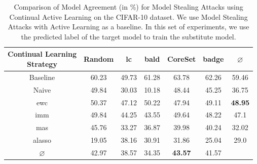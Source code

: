 \begin{table}[h]
    \centering
    \begin{tabular}{c | c c c c c | c} 
        \hline
        \diagbox[width=11em]{Active \\ Learning Strategy}{Continual Learning \\ Strategy} & Random & \gls{lc} & \gls{bald} & CoreSet & \gls{badge} & $\varnothing$\\ 
        \hline 
        Baseline & 60.23 & 49.73 & 61.28 & 63.78 & 62.26 & 59.46\\
        \hline
        Naive & 49.84 & 30.03 & 10.18 & 48.44 & 45.25 & 36.75\\
        \gls{ewc} & 50.37 & 47.12 & 50.22 & 47.94 & 49.11 & \textbf{48.95} \\
        \gls{imm} & 49.84 & 44.25 & 43.55 & 49.64 & 48.22 & 47.1\\
        \gls{mas} & 45.76 & 33.27 & 36.87 & 39.98 & 40.24 & 32.02\\
        \gls{alasso} & 19.05 & 38.16 & 30.91 & 31.86 & 25.04 & 29.0\\
        \hline
        $\varnothing$ & 42.97 & 38.57 & 34.35 & \textbf{43.57} & 41.57\\
        \hline
    \end{tabular}
    \caption[Model agreement of Continual Learning strategies on CIFAR-10 using the predicted class label]{Comparison of Model Agreement (in \%) for Model Stealing Attacks using Continual Active Learning on the CIFAR-10 dataset. We use Model Stealing Attacks with Active
    Learning as a baseline. In this set of experiments, we use the predicted label of the target model to train the substitute model.}
    \label{fig:ModelStealingCIFAR10Label}
\end{table}

